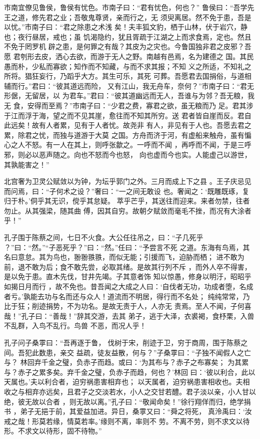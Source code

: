 \documentclass[12pt,UTF8]{ctexbook}
\begin{document}
市南宜僚见鲁侯，鲁侯有忧色。市南子曰：“君有忧色，何也？” 鲁侯曰：“吾学先王之道，修先君之业；吾敬鬼尊贤，亲而行之，无 须臾离居。然不免于患，吾是以忧。”市南子曰：“君之除患之术浅 矣！夫丰狐文豹，栖于山林，伏于岩穴，静也；夜行昼居，戒也；虽 饥渴隐约，犹且胥疏于江湖之上而求食焉，定也。然且不免于罔罗机 辟之患，是何罪之有哉？其皮为之灾也。今鲁国独非君之皮邪？吾愿 君刳形去皮，洒心去欲，而游于无人之野。南越有邑焉，名为建德之 国。其民愚而朴，少私而寡欲；知作而不知藏，与而不求其报；不知 义之所适，不知礼之所将。猖狂妄行，乃蹈乎大方。其生可乐，其死 可葬。吾愿君去国捐俗，与道相辅而行。”君曰：“彼其道远而险， 又有江山，我无舟车，奈何？”市南子曰：“君无形倨，无留居，以 为君车。”君曰：“彼其道幽远而无人，吾谁与为邻？吾无粮，我无 食，安得而至焉？”市南子曰：“少君之费，寡君之欲，虽无粮而乃 足。君其涉于江而浮于海，望之而不见其崖，愈往而不知其所穷。送 君者皆自崖而反。君自此远矣！故有人者累，见有于人者忧。故尧非 有人，非见有于人也。吾愿去君之累，除君之忧，而独与道游于大莫 之国。方舟而济于河，有虚船来触舟，虽有惼心之人不怒。有一人在其上，则呼张歙之。一呼而不闻 ，再呼而不闻，于是三呼邪，则必以恶声随之。向也不怒而今也怒， 向也虚而今也实。人能虚己以游世，其孰能害之！”

北宫奢为卫灵公赋敛以为钟，为坛乎郭门之外。三月而成上下之县 。王子庆忌见而问焉，曰：“子何术之设？”奢曰：“一之间无敢设 也。奢闻之：‘既雕既琢，复归于朴。’侗乎其无识，傥乎其怠疑。 萃乎芒乎，其送往而迎来。来者勿禁，往者勿止。从其强梁，随其曲 傅，因其自穷。故朝夕赋敛而毫毛不挫，而况有大涂者乎！”

孔子围于陈蔡之间，七日不火食。大公任往吊之，曰：“子几死乎 ？”曰：“然。”“子恶死乎？”曰：“然。”任曰：“予尝言不死 之道。东海有鸟焉，其名曰意怠。其为鸟也，翂翂翐翐，而似无能；引援而飞，迫胁而栖； 进不敢为前，退不敢为后；食不敢先尝，必取其绪。是故其行列不斥 ，而外人卒不得害，是以免于患。直木先伐，甘井先竭。子其意者饰 知以惊愚，修身以明汙，昭昭乎如揭日月而行 ，故不免也。昔吾闻之大成之人曰：‘自伐者无功，功成者堕，名成 者亏。’孰能去功与名而还与众人！道流而不明居，得行而不名处； 纯纯常常，乃比于狂；削迹捐势，不为功名。是故无责于人，人亦无 责焉。至人不闻，子何喜哉！”孔子曰：“善哉！”辞其交游，去其 弟子，逃于大泽，衣裘褐，食杼栗，入兽不乱群，入鸟不乱行。鸟兽 不恶，而况人乎！

孔子问子桑雽曰：“吾再逐于鲁， 伐树于宋，削迹于卫，穷于商周，围于陈蔡之间。吾犯此数患，亲交 益疏，徒友益散，何与？”子桑雽曰：“子独不闻假人之亡与？ 林回弃千金之璧，负赤子而趋。或曰：‘为其布与？赤子之布寡矣； 为其累与？赤子之累多矣。弃千金之璧，负赤子而趋，何也？’林回 曰：‘彼以利合，此以天属也。’夫以利合者，迫穷祸患害相弃也； 以天属者，迫穷祸患害相收也。夫相收之与相弃亦远矣，且君子之交淡若水，小人之交甘若醴。君子淡以亲，小人甘以绝，彼无故以合者 ，则无故以离。”孔子曰：“敬闻命矣！”徐行翔佯而归，绝学捐书 ，弟子无挹于前，其爱益加进。异日，桑雽又曰：“舜之将死， 真泠禹曰：‘汝戒之哉！形莫若缘，情莫若率。’缘则不离，率则不 劳。不离不劳，则不求文以待形。不求文以待形，固不待物。”
\end{document}
